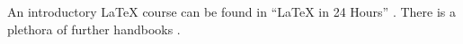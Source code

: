 An introductory \LaTeX{} course can be found in \enquote{\LaTeX{} in 24 Hours} \cite{datta2017}.
There is a plethora of further handbooks \cite*[e.\,g.,][]{goossensmittelbach2002}.


